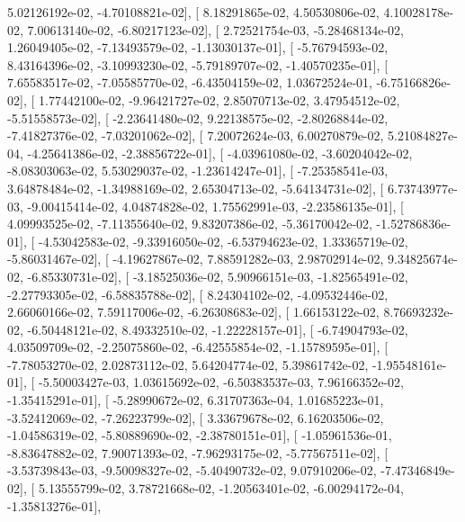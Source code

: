\documentclass{article}
\begin{document}
          5.02126192e-02,  -4.70108821e-02],
       [  8.18291865e-02,   4.50530806e-02,   4.10028178e-02,
          7.00613140e-02,  -6.80217123e-02],
       [  2.72521754e-03,  -5.28468134e-02,   1.26049405e-02,
         -7.13493579e-02,  -1.13030137e-01],
       [ -5.76794593e-02,   8.43164396e-02,  -3.10993230e-02,
         -5.79189707e-02,  -1.40570235e-01],
       [  7.65583517e-02,  -7.05585770e-02,  -6.43504159e-02,
          1.03672524e-01,  -6.75166826e-02],
       [  1.77442100e-02,  -9.96421727e-02,   2.85070713e-02,
          3.47954512e-02,  -5.51558573e-02],
       [ -2.23641480e-02,   9.22138575e-02,  -2.80268844e-02,
         -7.41827376e-02,  -7.03201062e-02],
       [  7.20072624e-03,   6.00270879e-02,   5.21084827e-04,
         -4.25641386e-02,  -2.38856722e-01],
       [ -4.03961080e-02,  -3.60204042e-02,  -8.08303063e-02,
          5.53029037e-02,  -1.23614247e-01],
       [ -7.25358541e-03,   3.64878484e-02,  -1.34988169e-02,
          2.65304713e-02,  -5.64134731e-02],
       [  6.73743977e-03,  -9.00415414e-02,   4.04874828e-02,
          1.75562991e-03,  -2.23586135e-01],
       [  4.09993525e-02,  -7.11355640e-02,   9.83207386e-02,
         -5.36170042e-02,  -1.52786836e-01],
       [ -4.53042583e-02,  -9.33916050e-02,  -6.53794623e-02,
          1.33365719e-02,  -5.86031467e-02],
       [ -4.19627867e-02,   7.88591282e-03,   2.98702914e-02,
          9.34825674e-02,  -6.85330731e-02],
       [ -3.18525036e-02,   5.90966151e-03,  -1.82565491e-02,
         -2.27793305e-02,  -6.58835788e-02],
       [  8.24304102e-02,  -4.09532446e-02,   2.66060166e-02,
          7.59117006e-02,  -6.26308683e-02],
       [  1.66153122e-02,   8.76693232e-02,  -6.50448121e-02,
          8.49332510e-02,  -1.22228157e-01],
       [ -6.74904793e-02,   4.03509709e-02,  -2.25075860e-02,
         -6.42555854e-02,  -1.15789595e-01],
       [ -7.78053270e-02,   2.02873112e-02,   5.64204774e-02,
          5.39861742e-02,  -1.95548161e-01],
       [ -5.50003427e-03,   1.03615692e-02,  -6.50383537e-03,
          7.96166352e-02,  -1.35415291e-01],
       [ -5.28990672e-02,   6.31707363e-04,   1.01685223e-01,
         -3.52412069e-02,  -7.26223799e-02],
       [  3.33679678e-02,   6.16203506e-02,  -1.04586319e-02,
         -5.80889690e-02,  -2.38780151e-01],
       [ -1.05961536e-01,  -8.83647882e-02,   7.90071393e-02,
         -7.96293175e-02,  -5.77567511e-02],
       [ -3.53739843e-03,  -9.50098327e-02,  -5.40490732e-02,
          9.07910206e-02,  -7.47346849e-02],
       [  5.13555799e-02,   3.78721668e-02,  -1.20563401e-02,
         -6.00294172e-04,  -1.35813276e-01],
\end{document}
